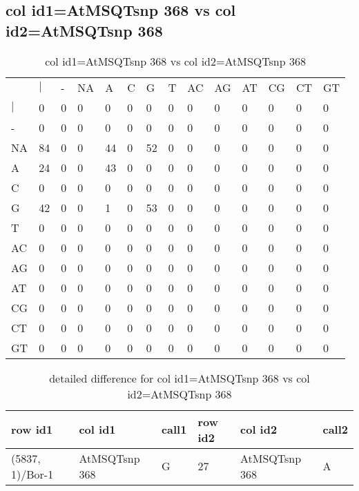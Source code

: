 \subsection{col id1=AtMSQTsnp 368 vs col id2=AtMSQTsnp 368}
\begin{center}
\begin{longtable}{|l|l|l|l|l|l|l|l|l|l|l|l|l|l|}
\caption{col id1=AtMSQTsnp 368 vs col id2=AtMSQTsnp 368} \label{table_dm886}\\
\hline
\\
\hline
&$|$&-&NA&A&C&G&T&AC&AG&AT&CG&CT&GT\\
$|$&0&0&0&0&0&0&0&0&0&0&0&0&0\\
-&0&0&0&0&0&0&0&0&0&0&0&0&0\\
NA&84&0&0&44&0&52&0&0&0&0&0&0&0\\
A&24&0&0&43&0&0&0&0&0&0&0&0&0\\
C&0&0&0&0&0&0&0&0&0&0&0&0&0\\
G&42&0&0&1&0&53&0&0&0&0&0&0&0\\
T&0&0&0&0&0&0&0&0&0&0&0&0&0\\
AC&0&0&0&0&0&0&0&0&0&0&0&0&0\\
AG&0&0&0&0&0&0&0&0&0&0&0&0&0\\
AT&0&0&0&0&0&0&0&0&0&0&0&0&0\\
CG&0&0&0&0&0&0&0&0&0&0&0&0&0\\
CT&0&0&0&0&0&0&0&0&0&0&0&0&0\\
GT&0&0&0&0&0&0&0&0&0&0&0&0&0\\
\hline
\end{longtable}
\end{center}

\begin{center}
\begin{longtable}{|l|l|l|l|l|l|}
\caption{detailed difference for col id1=AtMSQTsnp 368 vs col id2=AtMSQTsnp 368} \label{table_dm887}\\
\hline
row id1&col id1&call1&row id2&col id2&call2\\
\hline
(5837, 1)/Bor-1&AtMSQTsnp 368&G&27&AtMSQTsnp 368&A\\
\hline
\end{longtable}
\end{center}

